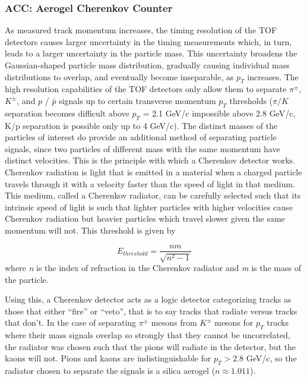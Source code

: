 \subsubsection{ACC: Aerogel Cherenkov Counter}
As measured track momentum increases, the timing resolution of the TOF detectors causes larger uncertainty in the timing measurements which, in turn, leads to a larger uncertainty in the particle mass. This uncertainty broadens the Gaussian-shaped particle mass distribution, gradually causing individual mass distributions to overlap, and eventually become inseparable, as $p_T$ increases. The high resolution capabilities of the TOF detectors only allow them to separate $\pi^{\pm}$, $K^{\pm}$, and $p$ / $\bar{p}$ signals up to certain transverse momentum $p_{T}$ thresholds ($\pi/K$ separation becomes difficult above $p_T$ = 2.1 GeV/c impossible above 2.8 GeV/c, K/p separation is possible only up to 4 GeV/c). The distinct masses of the particles of interest do provide an additional method of separating particle signals, since two particles of different mass with the same momentum have distinct velocities. This is the principle with which a Cherenkov detector works. Cherenkov radiation is light that is emitted in a material when a charged particle travels through it with a velocity faster than the speed of light in that medium. This medium, called a Cherenkov radiator, can be carefully selected such that its intrinsic speed of light is such that lighter particles with higher velocities cause Cherenkov radiation but heavier particles which travel slower given the same momentum will not. This threshold is given by

\begin{equation}
E_{threshold} = \frac{nm}{\sqrt{n^2-1}}
\end{equation}
where \textit{n} is the index of refraction in the Cherenkov radiator and \textit{m} is the mass of the particle.

Using this, a Cherenkov detector acts as a logic detector categorizing tracks as those that either ``fire'' or ``veto'', that is to say tracks that radiate versus tracks that don't. In the case of separating $\pi^{\pm}$ mesons from $K^{\pm}$ mesons for $p_{T}$ tracks where their mass signals overlap so strongly that they cannot be uncorrelated, the radiator was chosen such that the pions will radiate in the detector, but the kaons will not. Pions and kaons are indistinguishable for $p_{T} > 2.8$ GeV/c, so the radiator chosen to separate the signals is a silica aerogel ($n \approx 1.011$).

